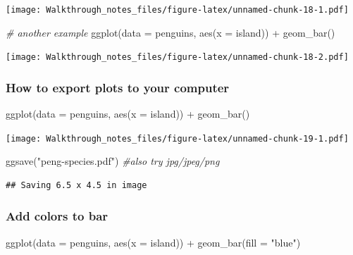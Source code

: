 \documentclass[
]{article}
\newenvironment{Shaded}{\begin{snugshade}}{\end{snugshade}}
\newcommand{\AttributeTok}[1]{\textcolor[rgb]{0.77,0.63,0.00}{#1}}
\newcommand{\CommentTok}[1]{\textcolor[rgb]{0.56,0.35,0.01}{\textit{#1}}}
\newcommand{\FunctionTok}[1]{\textcolor[rgb]{0.00,0.00,0.00}{#1}}
\newcommand{\NormalTok}[1]{#1}
\newcommand{\SpecialCharTok}[1]{\textcolor[rgb]{0.00,0.00,0.00}{#1}}
\newcommand{\StringTok}[1]{\textcolor[rgb]{0.31,0.60,0.02}{#1}}
\begin{document}
\texttt{[image: Walkthrough\_notes\_files/figure-latex/unnamed-chunk-18-1.pdf]}

\begin{Shaded}
\begin{Highlighting}[]
\CommentTok{\# another example}
\FunctionTok{ggplot}\NormalTok{(}\AttributeTok{data =}\NormalTok{ penguins, }\FunctionTok{aes}\NormalTok{(}\AttributeTok{x =}\NormalTok{ island)) }\SpecialCharTok{+} \FunctionTok{geom\_bar}\NormalTok{()}
\end{Highlighting}
\end{Shaded}

\texttt{[image: Walkthrough\_notes\_files/figure-latex/unnamed-chunk-18-2.pdf]}

\hypertarget{how-to-export-plots-to-your-computer}{%
\subsubsection{How to export plots to your
computer}\label{how-to-export-plots-to-your-computer}}

\begin{Shaded}
\begin{Highlighting}[]
\FunctionTok{ggplot}\NormalTok{(}\AttributeTok{data =}\NormalTok{ penguins, }\FunctionTok{aes}\NormalTok{(}\AttributeTok{x =}\NormalTok{ island)) }\SpecialCharTok{+} \FunctionTok{geom\_bar}\NormalTok{()}
\end{Highlighting}
\end{Shaded}

\texttt{[image: Walkthrough\_notes\_files/figure-latex/unnamed-chunk-19-1.pdf]}

\begin{Shaded}
\begin{Highlighting}[]
\FunctionTok{ggsave}\NormalTok{(}\StringTok{"peng{-}species.pdf"}\NormalTok{) }\CommentTok{\#also try jpg/jpeg/png}
\end{Highlighting}
\end{Shaded}

\begin{verbatim}
## Saving 6.5 x 4.5 in image
\end{verbatim}

\hypertarget{add-colors-to-bar}{%
\subsubsection{Add colors to bar}\label{add-colors-to-bar}}

\begin{Shaded}
\begin{Highlighting}[]
\FunctionTok{ggplot}\NormalTok{(}\AttributeTok{data =}\NormalTok{ penguins, }\FunctionTok{aes}\NormalTok{(}\AttributeTok{x =}\NormalTok{ island)) }\SpecialCharTok{+} 
  \FunctionTok{geom\_bar}\NormalTok{(}\AttributeTok{fill =} \StringTok{"blue"}\NormalTok{)}
\end{Highlighting}
\end{Shaded}
\end{document}
